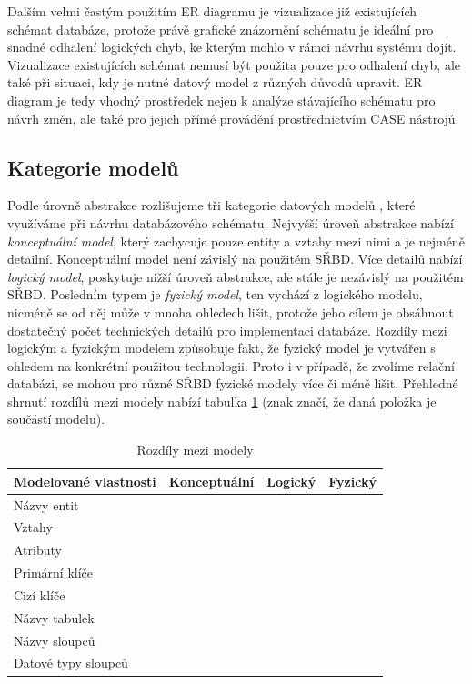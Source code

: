 \documentclass[czech,bachelor,public,dept460,male,oneside]{diploma}
\newcommand{\xmark}{\ding{55}}
\newcommand{\cmark}{\ding{51}}
\begin{document}
	Dalším velmi častým použitím ER diagramu je vizualizace již existujících schémat databáze, protože právě grafické znázornění schématu je ideální pro snadné odhalení logických chyb, ke kterým mohlo v rámci návrhu systému dojít.
	Vizualizace existujících schémat nemusí být použita pouze pro odhalení chyb, ale také při situaci, kdy je nutné datový model z různých důvodů upravit. ER diagram je tedy vhodný prostředek nejen k analýze stávajícího schématu pro návrh změn, ale také pro jejich přímé provádění prostřednictvím CASE nástrojů.
	
	\subsection{Kategorie modelů} \label{secModelCategory}
	Podle úrovně abstrakce rozlišujeme tři kategorie datových modelů \cite{whatIsERD}, které využíváme při návrhu databázového schématu. Nejvyšší úroveň abstrakce nabízí \emph{konceptuální model}, který zachycuje pouze entity a vztahy mezi nimi a je nejméně detailní. Konceptuální model není závislý na použitém SŘBD. Více detailů nabízí \emph{logický model}, poskytuje nižší úroveň abstrakce, ale stále je nezávislý na použitém SŘBD. Posledním typem je \emph{fyzický model}, ten vychází z logického modelu, nicméně se od něj může v mnoha ohledech lišit, protože jeho cílem je obsáhnout dostatečný počet technických detailů pro implementaci databáze. Rozdíly mezi logickým a fyzickým modelem způsobuje fakt, že fyzický model je vytvářen s ohledem na konkrétní použitou technologii. Proto i v případě, že zvolíme relační databázi, se mohou pro různé SŘBD fyzické modely více či méně lišit. Přehledné shrnutí rozdílů mezi modely nabízí tabulka \ref{tab:modelTypes} (znak \cmark značí, že daná položka je součástí modelu).
	
	\begin{table}[!h]
		\centering
		\caption{Rozdíly mezi modely}
		\label{tab:modelTypes}
		\begin{tabular}{l c c c}
			\toprule
			Modelované vlastnosti & Konceptuální & Logický & Fyzický \\
			\midrule
			Názvy entit & \cmark & \cmark & \xmark \\
			Vztahy & \cmark& \cmark & \xmark \\
			Atributy & \cmark& \cmark & \xmark \\
			Primární klíče & \xmark & \cmark & \cmark \\
			Cizí klíče & \xmark & \cmark & \cmark \\
			Názvy tabulek & \xmark & \xmark & \cmark \\
			Názvy sloupců & \xmark & \xmark & \cmark \\
			Datové typy sloupců & \xmark & \xmark & \cmark \\
			\midrule
		\end{tabular}
	\end{table}
	
\end{document}
